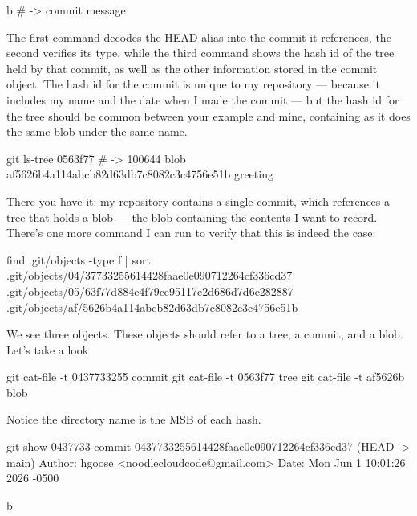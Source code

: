 \documentclass{report}
\begin{document}
\begin{itemize}
\begin{bashcode}
                b # -> commit message
            \end{bashcode}
            \bigbreak \noindent 
            The first command decodes the HEAD alias into the commit it references, the second verifies its type, while the third command shows the hash id of the tree held by that commit, as well as the other information stored in the commit object. The hash id for the commit is unique to my repository — because it includes my name and the date when I made the commit — but the hash id for the tree should be common between your example and mine, containing as it does the same blob under the same name.
            \bigbreak \noindent 
            \begin{bashcode}
                git ls-tree 0563f77 # -> 100644 blob af5626b4a114abcb82d63db7c8082c3c4756e51b greeting
            \end{bashcode}
            \bigbreak \noindent 
            There you have it: my repository contains a single commit, which references a tree that holds a blob — the blob containing the contents I want to record. There’s one more command I can run to verify that this is indeed the case:
            \bigbreak \noindent 
            \begin{bashcode}
                find .git/objects -type f | sort
                .git/objects/04/37733255614428faae0e090712264cf336cd37
                .git/objects/05/63f77d884e4f79ce95117e2d686d7d6e282887
                .git/objects/af/5626b4a114abcb82d63db7c8082c3c4756e51b
            \end{bashcode}
            \bigbreak \noindent 
            We see three objects. These objects should refer to a tree, a commit, and a blob. Let's take a look
            \bigbreak \noindent 
            \begin{bashcode}
                git cat-file -t 0437733255
                commit
                git cat-file -t 0563f77
                tree
                git cat-file -t af5626b
                blob
            \end{bashcode}
            \bigbreak \noindent 
            Notice the directory name is the MSB of each hash.
            \bigbreak \noindent 
            \begin{bashcode}
                git show 0437733
                commit 0437733255614428faae0e090712264cf336cd37 (HEAD -> main)
                Author: hgoose <noodlecloudcode@gmail.com>
                Date:   Mon Jun 1 10:01:26 2026 -0500

                b


\end{bashcode}
\end{itemize}
\end{document}
